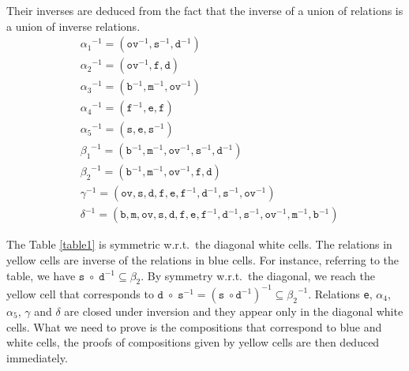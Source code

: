 \documentclass{llncs}
\begin{document}
Their inverses are deduced from the fact that the inverse of a union of relations is a union of inverse relations. %
\begin{align*}
& {\alpha_1}^{-1} = (\texttt{ov}^{-1}, \texttt{s}^{-1}, \texttt{d}^{-1}) \\
& {\alpha_2}^{-1} = (\texttt{ov}^{-1}, \texttt{f}, \texttt{d})\\
& {\alpha_3}^{-1} = (\texttt{b}^{-1}, \texttt{m}^{-1}, \texttt{ov}^{-1})\\
& {\alpha_4}^{-1} = (\texttt{f}^{-1}, \texttt{e}, \texttt{f})\\
&  {\alpha_5}^{-1} = (\texttt{s}, \texttt{e}, \texttt{s}^{-1})\\
&  {\beta_1}^{-1} = (\texttt{b}^{-1}, \texttt{m}^{-1}, \texttt{ov}^{-1}, \texttt{s}^{-1}, \texttt{d}^{-1})\\  
& {\beta_2}^{-1} = (\texttt{b}^{-1}, \texttt{m}^{-1}, \texttt{ov}^{-1}, \texttt{f}, \texttt{d})\\ 
& {\gamma}^{-1} = (\texttt{ov}, \texttt{s}, \texttt{d}, \texttt{f}, \texttt{e}, \texttt{f}^{-1}, \texttt{d}^{-1}, \texttt{s}^{-1}, \texttt{ov}^{-1})\\
& {\delta}^{-1} = (\texttt{b},\texttt{m},\texttt{ov}, \texttt{s}, \texttt{d}, \texttt{f}, \texttt{e}, \texttt{f}^{-1}, \texttt{d}^{-1}, \texttt{s}^{-1}, \texttt{ov}^{-1}, \texttt{m}^{-1}, \texttt{b}^{-1})
\end{align*}

The Table \ref{table1} is symmetric w.r.t.~the diagonal white cells. The relations in yellow cells  are inverse of the relations in blue cells. For instance, referring to the table, we have $\texttt{s}\; \circ \;\texttt{d}^{-1} \subseteq \beta_2$. By symmetry w.r.t.~the diagonal, we reach the yellow cell that corresponds to $\texttt{d}\; \circ\; \texttt{s}^{-1} = (\texttt{s}\; \circ \texttt{d}^{-1})^{-1} \subseteq {\beta_2}^{-1}$. Relations \texttt{e}, $\alpha_4$, $\alpha_5$, $\gamma$ and $\delta$ are closed under inversion and they appear only in the diagonal white cells. What we need to prove is the compositions that correspond to blue and white cells, the proofs of compositions given by yellow cells are then deduced immediately. %

\end{document}
